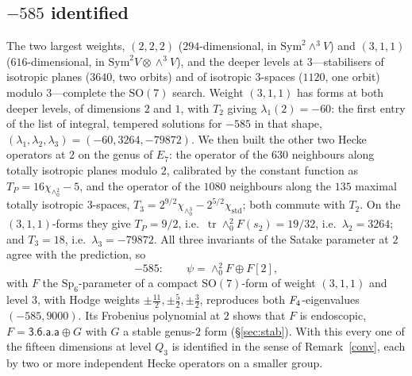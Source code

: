 \documentclass[11pt]{amsart}
\theoremstyle{definition}
\begin{document}
\subsection{$-585$ identified}\label{sec:585} The two largest weights, $(2,2,2)$ ($294$-dimensional, in $\mathrm{Sym}^2\wedge^3V$) and $(3,1,1)$ ($616$-dimensional, in $\mathrm{Sym}^2V\otimes\wedge^3V$), and the deeper levels at $3$---stabilisers of isotropic planes ($3640$, two orbits) and of isotropic $3$-spaces ($1120$, one orbit) modulo $3$---complete the $\mathrm{SO}(7)$ search. Weight $(3,1,1)$ has forms at both deeper levels, of dimensions $2$ and $1$, with $T_2$ giving $\lambda_1(2)=-60$: the first entry of the list of integral, tempered solutions for $-585$ in that shape, $(\lambda_1,\lambda_2,\lambda_3)=(-60,3264,-79872)$. We then built the other two Hecke operators at $2$ on the genus of $E_7$: the operator of the $630$ neighbours along totally isotropic planes modulo $2$, calibrated by the constant function as $T_P=16\chi_{\wedge^2_0}-5$, and the operator of the $1080$ neighbours along the $135$ maximal totally isotropic $3$-spaces, $T_3=2^{9/2}\chi_{\wedge^3_0}-2^{5/2}\chi_{\mathrm{std}}$; both commute with $T_2$. On the $(3,1,1)$-forms they give $T_P=9/2$, i.e.\ $\operatorname{tr}\wedge^2_0F(s_2)=19/32$, i.e.\ $\lambda_2=3264$; and $T_3=18$, i.e.\ $\lambda_3=-79872$. All three invariants of the Satake parameter at $2$ agree with the prediction, so
\[-585:\qquad\psi=\wedge^2_0F\oplus F[2],\]
with $F$ the $\mathrm{Sp}_6$-parameter of a compact $\mathrm{SO}(7)$-form of weight $(3,1,1)$ and level $3$,
with Hodge weights $\pm\tfrac{11}2,\pm\tfrac52,\pm\tfrac32$, reproduces both $F_4$-eigenvalues $(-585,9000)$. Its Frobenius polynomial at $2$ shows that $F$ is endoscopic, $F=\textsf{3.6.a.a}\oplus G$ with $G$ a stable genus-$2$ form (\S\ref{sec:stab}). With this every one of the fifteen dimensions at level $Q_3$ is identified in the sense of Remark~\ref{conv}, each by two or more independent Hecke operators on a smaller group.
\end{document}
